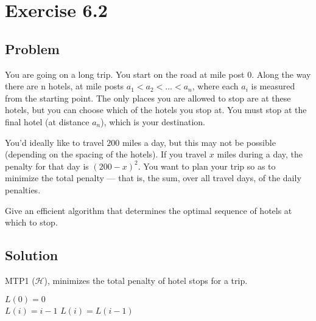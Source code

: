 \documentclass[12pt, letterpaper]{article}
\begin{document}
\section{Exercise 6.2}

\subsection{Problem}

You are going on a long trip. You start on the road at mile post \(0\). Along the way there are n hotels, at mile posts \(a_1 < a_2 < \dots < a_n\), where each \(a_i\) is measured from the starting point. The only places you are allowed to stop are at these hotels, but you can choose which of the hotels you stop at. You must stop at the final hotel (at distance \(a_n\)), which is your destination.

\par
You'd ideally like to travel \(200\) miles a day, but this may not be possible (depending on the spacing of the hotels). If you travel \(x\) miles during a day, the penalty for that day is \((200 - x)^2\). You want to plan your trip so as to minimize the total penalty --- that is, the sum, over all travel days, of the daily penalties.

\par
Give an efficient algorithm that determines the optimal sequence of hotels at which to stop.

\subsection{Solution}

\begin{algorithm}
    \caption{MTP1 (\(\mathcal{H}\)), minimizes the total penalty of hotel stops for a trip.}
    \(L(0) = 0\) \\
    {
        {
            \(L(i) = i-1\) 
        }
        {
            \(L(i) = L(i-1)\)
        }
    }
\end{algorithm}
\end{document}
